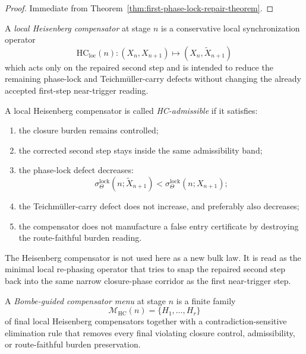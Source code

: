\begin{proof}
Immediate from Theorem~\ref{thm:first-phase-lock-repair-theorem}.
\end{proof}



\begin{definition}
\label{def:local-heisenberg-compensator}
A \emph{local Heisenberg compensator} at stage $n$ is a conservative local synchronization operator
\[
 \mathrm{HC}_{\mathrm{loc}}(n):(X_n,X_{n+1})\longmapsto (X_n,\widetilde X_{n+1})
\]
which acts only on the repaired second step and is intended to reduce the remaining phase-lock and Teichm\"uller-carry defects without changing the already accepted first-step near-trigger reading.
\end{definition}

\begin{definition}
\label{def:hc-admissible-local-compensation}
A local Heisenberg compensator is called \emph{HC-admissible} if it satisfies:
\begin{enumerate}[leftmargin=2em,label=(\alph*)]
 \item the closure burden remains controlled;
 \item the corrected second step stays inside the same admissibility band;
 \item the phase-lock defect decreases:
 \[
 \sigma_{\Theta}^{\mathrm{lock}}(n;\widetilde X_{n+1})
 <
 \sigma_{\Theta}^{\mathrm{lock}}(n;X_{n+1});
 \]
 \item the Teichm\"uller-carry defect does not increase, and preferably also decreases;
 \item the compensator does not manufacture a false entry certificate by destroying the route-faithful burden reading.
\end{enumerate}
\end{definition}

\begin{remark}
\label{rem:how-the-hc-is-read-here}
The Heisenberg compensator is not used here as a new bulk law. It is read as the minimal local re-phasing operator that tries to snap the repaired second step back into the same narrow closure-phase corridor as the first near-trigger step.
\end{remark}

\begin{definition}
\label{def:bombe-guided-compensator-menu}
A \emph{Bombe-guided compensator menu} at stage $n$ is a finite family
\[
 \mathcal M_{\mathrm{HC}}(n)=\{H_1,\dots,H_r\}
\]
of final local Heisenberg compensators together with a contradiction-sensitive elimination rule that removes every final violating closure control, admissibility, or route-faithful burden preservation.
\end{definition}

